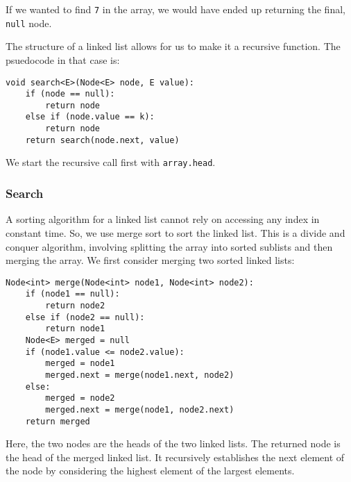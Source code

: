 \documentclass[a4paper, openany]{memoir}
\begin{document}
\noindent If we wanted to find \texttt{7} in the array, we would have ended up returning the final, \texttt{null} node.

\noindent The structure of a linked list allows for us to make it a recursive function. The psuedocode in that case is:
\begin{lstlisting}[language=pseudocode]
void search<E>(Node<E> node, E value):
    if (node == null):
        return node
    else if (node.value == k):
        return node
    return search(node.next, value)
\end{lstlisting}
We start the recursive call first with \texttt{array.head}.
\subsubsection{Search}
A sorting algorithm for a linked list cannot rely on accessing any index in constant time. So, we use merge sort to sort the linked list. This is a divide and conquer algorithm, involving splitting the array into sorted sublists and then merging the array. We first consider merging two sorted linked lists:
\begin{lstlisting}[language=pseudocode]
Node<int> merge(Node<int> node1, Node<int> node2):
    if (node1 == null):
        return node2
    else if (node2 == null):
        return node1
    Node<E> merged = null
    if (node1.value <= node2.value):
        merged = node1
        merged.next = merge(node1.next, node2)
    else:
        merged = node2
        merged.next = merge(node1, node2.next)
    return merged
\end{lstlisting}
Here, the two nodes are the heads of the two linked lists. The returned node is the head of the merged linked list. It recursively establishes the next element of the node by considering the highest element of the largest elements.
\end{document}
